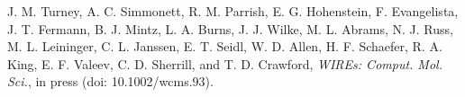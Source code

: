 J. M. Turney, A. C. Simmonett, R. M. Parrish, E. G. Hohenstein,
F. Evangelista, J. T. Fermann, B. J. Mintz, L. A. Burns, J. J. Wilke,
M. L. Abrams, N. J. Russ, M. L. Leininger, C. L. Janssen, E. T. Seidl,
W. D. Allen, H. F. Schaefer, R. A. King, E. F. Valeev, C. D. Sherrill,
and T. D. Crawford,
{\em WIREs: Comput. Mol. Sci.}, in press (doi: 10.1002/wcms.93).
